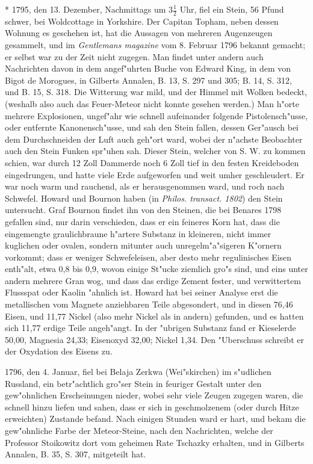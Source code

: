 \documentclass[a4paper, 11pt, oneside, polutonikogreek, german]{article}
\begin{document}
* 1795, den 13. Dezember, Nachmittags um $\mathfrak{3\frac{1}{2}}$ Uhr, fiel ein Stein, 56 Pfund schwer, bei Woldcottage in Yorkshire. Der Capitan Topham, neben dessen Wohnung es geschehen ist, hat die Aussagen von mehreren Augenzeugen gesammelt, und im \emph{Gentlemans magazine} vom 8. Februar 1796 bekannt gemacht; er selbst war zu der Zeit nicht zugegen. Man findet unter andern auch Nachrichten davon in dem angef"uhrten Buche von Edward King, in dem von Bigot de Morogues, in Gilberts Annalen, B. 13, S. 297 und 305; B. 14, S. 312, und B. 15, S. 318. Die Witterung war mild, und der Himmel mit Wolken bedeckt, (weshalb also auch das Feuer-Meteor nicht konnte gesehen werden.) Man h"orte mehrere Explosionen, ungef"ahr wie schnell aufeinander folgende Pistolensch"usse, oder entfernte Kanonensch"usse, und sah den Stein fallen, dessen Ger"ausch bei dem Durchschneiden der Luft auch geh"ort ward, wobei der n"achste Beobachter auch den Stein Funken spr"uhen sah. Dieser Stein, welcher von S. W. zu kommen schien, war durch 12 Zoll Dammerde noch 6 Zoll tief in den festen Kreideboden eingedrungen, und hatte viele Erde aufgeworfen und weit umher geschleudert. Er war noch warm und rauchend, als er herausgenommen ward, und roch nach Schwefel. Howard und Bournon haben (in \emph{Philos. transact. 1802}) den Stein untersucht. Graf Bournon findet ihn von den Steinen, die bei Benares 1798 gefallen sind, nur darin verschieden, dass er ein feineres Korn hat, dass die eingemengte graulichbraune h"artere Substanz in kleineren, nicht immer kuglichen oder ovalen, sondern mitunter auch unregelm"a"sigeren K"ornern vorkommt; dass er weniger Schwefeleisen, aber desto mehr regulinisches Eisen enth"alt, etwa 0,8 bis 0,9, wovon einige St"ucke ziemlich gro"s sind, und eins unter andern mehrere Gran wog, und dass das erdige Zement fester, und verwittertem Flussspat oder Kaolin "ahnlich ist. Howard hat bei seiner Analyse erst die metallischen vom Magnete anziehbaren Teile abgesondert, und in diesen 76,46 Eisen, und 11,77 Nickel (also mehr Nickel als in andern) gefunden, und es hatten sich 11,77 erdige Teile angeh"angt. In der "ubrigen Substanz fand er Kieselerde 50,00, Magnesia 24,33; Eisenoxyd 32,00; Nickel 1,34. Den "Uberschuss schreibt er der Oxydation des Eisens zu.

1796, den 4. Januar, fiel bei Belaja Zerkwa (Wei"skirchen) im s"udlichen Russland, ein betr"achtlich gro"ser Stein in feuriger Gestalt unter den gew"ohnlichen Erscheinungen nieder, wobei sehr viele Zeugen zugegen waren, die schnell hinzu liefen und sahen, dass er sich in geschmolzenem (oder durch Hitze erweichten) Zustande befand. Nach einigen Stunden ward er hart, und bekam die gew"ohnliche Farbe der Meteor-Steine, nach den Nachrichten, welche der Professor Stoikowitz dort vom geheimen Rate Tschazky erhalten, und in Gilberts Annalen, B. 35, S. 307, mitgeteilt hat.
\end{document}

